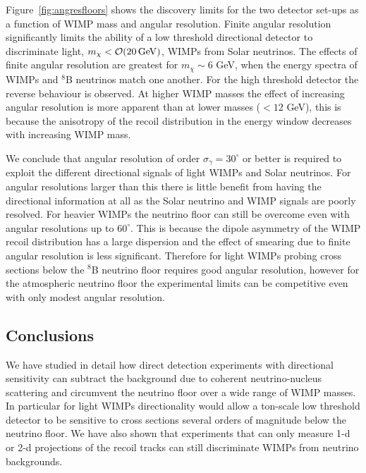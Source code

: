 Figure~\ref{fig:angresfloors} shows the discovery limits for the two detector set-ups as a function of WIMP mass and angular resolution. Finite angular resolution significantly limits the ability of a low threshold directional detector to discriminate light, $m_{\chi} < {\cal O}(20 \, {\rm GeV})$, WIMPs from Solar neutrinos. The effects of finite angular resolution are greatest for $m_\chi \sim 6$ GeV, when the energy spectra of WIMPs and $^8$B neutrinos match one another. For the high threshold detector the reverse behaviour is observed. At higher WIMP masses the effect of increasing angular resolution is more apparent than at lower masses ($<12$ GeV), this is because the anisotropy of the recoil distribution in the energy window decreases with increasing WIMP mass.

We conclude that angular resolution of order $\sigma_{\gamma} = 30^{\circ}$ or better is required to exploit the different directional signals of light WIMPs and Solar neutrinos. For angular resolutions larger than this there is little benefit from having the directional information at all as the Solar neutrino and WIMP signals are poorly resolved. For heavier WIMPs the neutrino floor can still be overcome even with angular resolutions up to $60^\circ$. This is because the dipole asymmetry of the WIMP recoil distribution has a large dispersion and the effect of smearing due to finite angular resolution is less significant. Therefore for light WIMPs probing cross sections below the $^8$B neutrino floor requires good angular resolution, however for the atmospheric neutrino floor the experimental limits can be competitive even with only modest angular resolution.

\subsection{Conclusions}
We have studied in detail how direct detection experiments with directional sensitivity can subtract the background due to coherent neutrino-nucleus scattering and circumvent the neutrino floor over a wide range of WIMP masses. In particular for light WIMPs directionality would allow a ton-scale low threshold detector to be sensitive to cross sections several orders of magnitude below the neutrino floor. We have also shown that experiments that can only measure 1-d or 2-d projections of the recoil tracks can still discriminate WIMPs from neutrino backgrounds.

